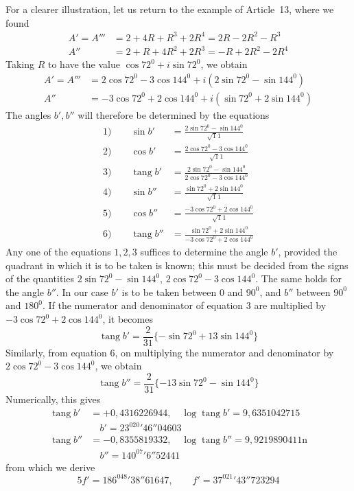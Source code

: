 \clearpage
\hypertarget{native-270-pure17}{}\label{native-270-pure17}
For a clearer illustration, let us return to the example of Article~13, where we found
\[
\begin{aligned}
A'=A'''&=2+4R+R^3+2R^4=2R-2R^2-R^3\\
A''&=2+R+4R^2+2R^3=-R+2R^2-2R^4
\end{aligned}
\]
Taking $R$ to have the value $\cos72^0+i\sin72^0$, we obtain
\[
\begin{aligned}
A'=A'''&=2\cos72^0-3\cos144^0+i(2\sin72^0-\sin144^0)\\
A''&=-3\cos72^0+2\cos144^0+i(\sin72^0+2\sin144^0)
\end{aligned}
\]
The angles $b',b''$ will therefore be determined by the equations
\[
\begin{aligned}
1)\qquad\sin b'&=\frac{2\sin72^0-\sin144^0}{\surd11}\\
2)\qquad\cos b'&=\frac{2\cos72^0-3\cos144^0}{\surd11}\\
3)\qquad\operatorname{tang}b'&=\frac{2\sin72^0-\sin144^0}{2\cos72^0-3\cos144^0}\\
4)\qquad\sin b''&=\frac{\sin72^0+2\sin144^0}{\surd11}\\
5)\qquad\cos b''&=\frac{-3\cos72^0+2\cos144^0}{\surd11}\\
6)\qquad\operatorname{tang}b''&=\frac{\sin72^0+2\sin144^0}{-3\cos72^0+2\cos144^0}
\end{aligned}
\]
Any one of the equations $1,2,3$ suffices to determine the angle $b'$, provided the quadrant in which it is to be taken is known; this must be decided from the signs of the quantities $2\sin72^0-\sin144^0$, $2\cos72^0-3\cos144^0$. The same holds for the angle $b''$. In our case $b'$ is to be taken between $0$ and $90^0$, and $b''$ between $90^0$ and $180^0$. If the numerator and denominator of equation $3$ are multiplied by $-3\cos72^0+2\cos144^0$, it becomes
\[
\operatorname{tang}b'=\frac2{31}\{-\sin72^0+13\sin144^0\}
\]
Similarly, from equation $6$, on multiplying the numerator and denominator by $2\cos72^0-3\cos144^0$, we obtain
\[
\operatorname{tang}b''=\frac2{31}\{-13\sin72^0-\sin144^0\}
\]
Numerically, this gives
\[
\begin{aligned}
\operatorname{tang}b'&=+0{,}4316226944,\quad\log\operatorname{tang}b'=9{,}6351042715\\
&\hspace{1em}b'=23^020'46''04603\\
\operatorname{tang}b''&=-0{,}8355819332,\quad\log\operatorname{tang}b''=9{,}9219890411\mathrm n\\
&\hspace{1em}b''=140^07'6''52441
\end{aligned}
\]
from which we derive
\[
5f'=186^048'38''61647,\qquad f'=37^021'43''723294
\]

